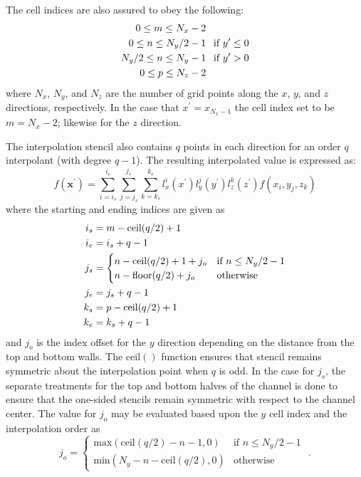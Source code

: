 \documentclass[11pt]{article}
\begin{document}
The cell indices are also assured to obey the following:
\begin{align}
  0 \leq m \leq N_x - 2 & \notag \\
  0 \leq n \leq N_y/2 - 1 &\text{\hspace{1ex} if } y^\prime \leq 0 \\
  N_y/2 \leq n \leq N_y - 1 &\text{\hspace{1ex} if } y^\prime > 0 \notag \\
  0 \leq p \leq N_z - 2 &\notag
\end{align}
where $N_x$, $N_y$, and $N_z$ are the number of grid points along the $x$, $y$, and
$z$ directions, respectively. In the case that $x^\prime = x_{N_x-1}$ the cell index set to be $m=N_x-2$; likewise for the $z$ direction.
 
The interpolation stencil also contains $q$ points in each direction for an order $q$
interpolant (with degree $q-1$). The resulting interpolated value is expressed as:
\begin{equation}\label{eq:interp_poly}
  f(\bm{x}^\prime) = \sum_{i=i_s}^{i_e}\sum_{j=j_s}^{j_e}\sum_{k=k_s}^{k_e}  l_x^{i}(x^\prime) l_y^{j}(y^\prime) l_z^{k}(z^\prime)f(x_{i}, y_{j}, z_{k})
\end{equation}
where the starting and ending indices are given as
\begin{align}
i_s &= m - \text{ceil}(q/2) + 1\notag\\
i_e &= i_s + q - 1 \notag\\
j_s &= 
\begin{cases} 
  n - \text{ceil}(q/2) + 1 + j_o &\mbox{if } n \leq N_y / 2 - 1 \\
  n - \text{floor}(q/2) + j_o &\mbox{otherwise} 
\end{cases} \\
j_e &= j_s + q - 1 \notag\\
k_s &= p - \text{ceil}(q/2) + 1 \notag\\
k_e &= k_s + q - 1 \notag
\end{align}
and $j_o$ is the index offset for the $y$ direction depending on the distance from the top and bottom walls. The $\text{ceil}()$ function ensures that stencil remains symmetric about the interpolation point when $q$ is odd. In the case for $j_s$, the separate treatments for the top and bottom halves of the channel is done to ensure that the one-sided stencils remain symmetric with respect to the channel center. The value for $j_o$ may be evaluated based upon the $y$ cell index and the interpolation order as 
\begin{equation}
  j_o = 
  \begin{cases} 
    \text{max}(\text{ceil}(q/2)-n-1,0) &\mbox{if } n \leq N_y/2-1 \\
    \text{min}(N_y - n - \text{ceil}(q/2),0) & \mbox{otherwise}  
  \end{cases}	
  \mbox{ .}
\end{equation}
\end{document}
